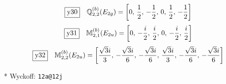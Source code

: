 \documentclass[fleqn,10pt,landscape]{jsarticle}
\begin{document}
\begin{dmath*}
\fbox{y30}\quad \mathbb{Q}_{2,2}^{(b)}(E_{2g})=\left[ 0,\, \frac{1}{2},\, - \frac{1}{2},\, 0,\, \frac{1}{2},\, - \frac{1}{2} \right]
\end{dmath*}
\begin{dmath*}
\fbox{y31}\quad \mathbb{M}_{2,1}^{(b)}(E_{2u})=\left[ 0,\, - \frac{i}{2},\, \frac{i}{2},\, 0,\, - \frac{i}{2},\, \frac{i}{2} \right]
\end{dmath*}
\begin{dmath*}
\fbox{y32}\quad \mathbb{M}_{2,2}^{(b)}(E_{2u})=\left[ \frac{\sqrt{3} i}{3},\, - \frac{\sqrt{3} i}{6},\, - \frac{\sqrt{3} i}{6},\, \frac{\sqrt{3} i}{3},\, - \frac{\sqrt{3} i}{6},\, - \frac{\sqrt{3} i}{6} \right]
\end{dmath*}
\vspace{5mm}

\noindent ** Wyckoff: \texttt{12a@12j}
\end{document}
